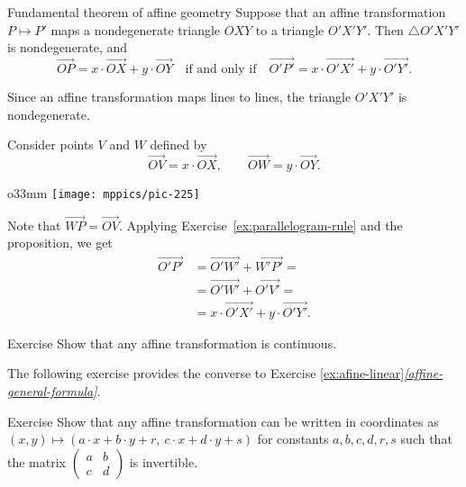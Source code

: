 \begin{thm}{Fundamental theorem of affine geometry}\label{thm:fundamental-theorem-of-affine-geometry}
Suppose that an affine transformation $P\mapsto P'$ maps a nondegenerate triangle $OXY$ to a triangle $O'X'Y'$.
Then $\triangle O'X'Y'$ is nondegenerate, and
\[\overrightarrow{OP}=x\cdot\overrightarrow{OX}+y\cdot\overrightarrow{OY}\quad\text{if and only if}\quad\overrightarrow{O'P'}=x\cdot\overrightarrow{O'X'}+y\cdot\overrightarrow{O'Y'}.\]
\end{thm}

Since an affine transformation maps lines to lines, the triangle
$O'X'Y'$ is nondegenerate.

Consider points $V$ and $W$ defined by
\[\overrightarrow{OV}=x\cdot\overrightarrow{OX},
\qquad
\overrightarrow{OW}=y\cdot\overrightarrow{OY}.
\]

{

\begin{wrapfigure}{o}{33mm}
\centering
\vskip-0mm
\texttt{[image: mppics/pic-225]}
\end{wrapfigure}

Note that 
$\overrightarrow{WP}=\overrightarrow{OV}$.
Applying Exercise~\ref{ex:parallelogram-rule} and the proposition, we get
\begin{align*}\overrightarrow{O'P'}&=\overrightarrow{O'W'}+\overrightarrow{W'P'}=
\\
&=\overrightarrow{O'W'}+\overrightarrow{O'V'}=
\\
&=x\cdot\overrightarrow{O'X'}+y\cdot\overrightarrow{O'Y'}.
\end{align*}
\qedsf

}

\begin{thm}{Exercise}\label{ex:affine-continuous}
Show that any affine transformation is continuous.
\end{thm}

The following exercise provides the converse to Exercise \ref{ex:afine-linear}\textit{\ref{affine-general-formula}}.

\begin{thm}{Exercise}\label{ex:affine-coordinates}
Show that any affine transformation can be written in coordinates as 
$(x,y)\mapsto(a\cdot x+b\cdot y+r,\ c\cdot x+d\cdot y+s)$
for constants $a,b,c,d,r,s$ such that the matrix $(\begin{smallmatrix}a&b\\c&d\end{smallmatrix})$ is invertible. 
\end{thm}

